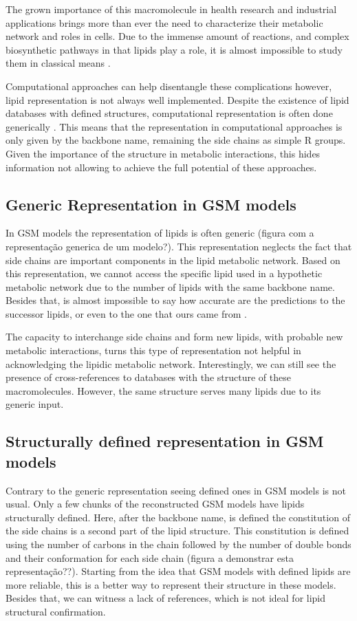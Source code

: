 \documentclass{llncs}
\begin{document}
The grown importance of this macromolecule in health research and industrial applications brings more than ever the need to characterize their metabolic network and roles in cells.
Due to the immense amount of reactions, and complex biosynthetic pathways in that lipids play a role, it is almost impossible to study them in classical means \cite{Schutzhold}.

Computational approaches can help disentangle these complications however, lipid representation is not always well implemented.
Despite the existence of lipid databases with defined structures, computational representation is often done generically \cite{Aung2013}. 
This means that the representation in computational approaches is only given by the backbone name, remaining the side chains as simple R groups.
Given the importance of the structure in metabolic interactions, this hides information not allowing to achieve the full potential of these approaches.

\subsection{Generic Representation in GSM models}
In GSM models the representation of lipids is often generic (figura com a representação generica de um modelo?). This representation neglects the fact that side chains are important components in the lipid metabolic network.
Based on this representation, we cannot access the specific lipid used in a hypothetic metabolic network due to the number of lipids with the same backbone name.
Besides that, is almost impossible to say how accurate are the predictions to the successor lipids, or even to the one that ours came from \cite{Aung2013}.

The capacity to interchange side chains and form new lipids, with probable new metabolic interactions, turns this type of representation not helpful in acknowledging the lipidic metabolic network.
Interestingly, we can still see the presence of cross-references to databases with the structure of these macromolecules. However, the same structure serves many lipids due to its generic input.

\subsection{Structurally defined representation in GSM models}
Contrary to the generic representation seeing defined ones in GSM models is not usual. Only a few chunks of the reconstructed GSM models have lipids structurally defined.
Here, after the backbone name, is defined the constitution of the side chains is a second part of the lipid structure. This constitution is defined using the number of carbons in the chain followed by the number of double bonds and their conformation for each side chain (figura a demonstrar esta representação??).
Starting from the idea that GSM models with defined lipids are more reliable, this is a better way to represent their structure in these models. 
Besides that, we can witness a lack of references, which is not ideal for lipid structural confirmation.
\end{document}
